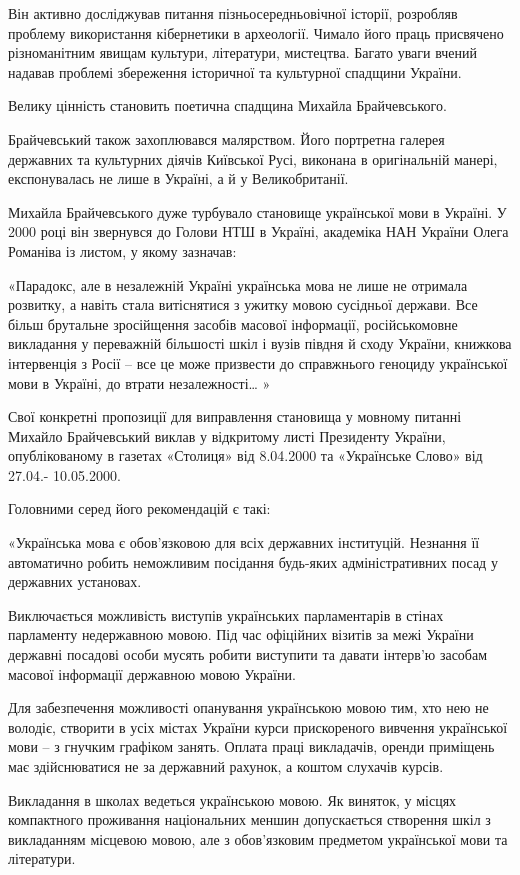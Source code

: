 Він активно досліджував питання пізньосередньовічної історії, розробляв
проблему використання кібернетики в археології. Чимало його праць присвячено
різноманітним явищам культури, літератури, мистецтва. Багато уваги вчений
надавав проблемі збереження історичної та культурної спадщини України. 

Велику цінність становить поетична спадщина Михайла Брайчевського.

Брайчевський також захоплювався малярством. Його портретна галерея державних та
культурних діячів Київської Русі, виконана в оригінальній манері, експонувалась
не лише в Україні, а й у Великобританії.

Михайла Брайчевського дуже турбувало становище української мови в Україні. У
2000 році він звернувся до Голови НТШ в Україні, академіка НАН України Олега
Романіва із листом, у якому зазначав:

«Парадокс, але в незалежній Україні українська мова не лише не отримала
розвитку, а навіть стала витіснятися з ужитку мовою сусідньої держави. Все
більш брутальне зросійщення засобів масової інформації, російськомовне
викладання у переважній більшості шкіл і вузів півдня й сходу України, книжкова
інтервенція з Росії – все це може призвести до справжнього геноциду української
мови в Україні, до втрати незалежності… »  

Свої конкретні пропозиції для виправлення становища у мовному питанні Михайло
Брайчевський виклав у відкритому листі Президенту України, опублікованому в
газетах «Столиця» від 8.04.2000 та «Українське Слово» від 27.04.- 10.05.2000.

Головними серед його рекомендацій є такі:

«Українська мова є обов’язковою для всіх державних інституцій. Незнання її
автоматично робить неможливим посідання будь-яких адміністративних посад у
державних установах.

Виключається можливість виступів українських парламентарів в стінах парламенту
недержавною мовою. Під час офіційних візитів за межі України державні посадові
особи мусять робити виступити та давати інтерв’ю засобам масової інформації
державною мовою України.

Для забезпечення можливості опанування українською мовою тим, хто нею не
володіє, створити в усіх містах України курси прискореного вивчення української
мови – з гнучким графіком занять. Оплата праці викладачів, оренди приміщень має
здійснюватися не за державний рахунок, а коштом слухачів курсів.

Викладання в школах ведеться українською мовою. Як виняток, у місцях
компактного проживання національних меншин допускається створення шкіл з
викладанням місцевою мовою, але з обов’язковим предметом української мови та
літератури.

